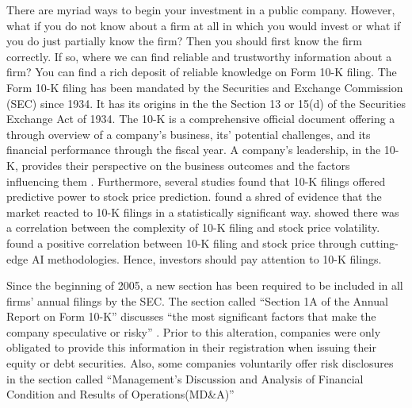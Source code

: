 \documentclass[logo,bsc,singlespacing,parskip]{infthesis}
\begin{document}
There are myriad ways to begin your investment in a public company. However, what if you do not know about a firm at all in which you would invest or what if you do just partially know the firm? Then you should first know the firm correctly. If so, where we can find reliable and trustworthy information about a firm? You can find a rich deposit of reliable knowledge on Form 10-K filing. The Form 10-K filing has been mandated by the Securities and Exchange Commission (SEC) since 1934. It has its origins in the the Section 13 or 15(d) of the Securities Exchange Act of 1934. The 10-K is a comprehensive official document offering a through overview of a company’s business, its’ potential challenges, and its financial performance through the fiscal year. A company’s leadership, in the 10-K, provides their perspective on the business outcomes and the factors influencing them \cite{SEC2024}. Furthermore, several studies found that 10-K filings offered predictive power to stock price prediction\cite {Asthana2001, You2009, Kim2019, Blomme2020, Jønsson2020}. \cite{Asthana2001} found a shred of evidence that the market reacted to 10-K filings in a statistically significant way. \cite{Kim2019, You2009} showed there was a correlation between the complexity of 10-K filing and stock price volatility. \cite{Blomme2020, Jønsson2020} found a positive correlation between 10-K filing and stock price through cutting-edge AI methodologies. Hence, investors should pay attention to 10-K filings. 

Since the beginning of 2005, a new section has been required to be included in all firms’ annual filings by the SEC. The section called “Section 1A of the Annual Report on Form 10-K” discusses “the most significant factors that make the company speculative or risky” \cite{sec2005}. Prior to this alteration, companies were only obligated to provide this information in their registration when issuing their equity or debt securities. Also, some companies voluntarily offer risk disclosures in the section called “Management’s Discussion and Analysis of Financial Condition and Results of Operations(MD\&A)” 
\end{document}
